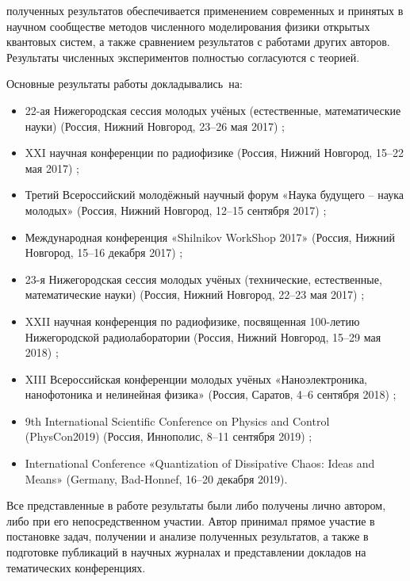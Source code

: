 {\reliability} полученных результатов обеспечивается применением современных и принятых в научном сообществе методов численного моделирования физики открытых квантовых систем, а также сравнением результатов с работами других авторов. 
Результаты численных экспериментов полностью согласуются с теорией.

{\probation}
Основные результаты работы докладывались~на:

\begin{itemize}
	\item 22-ая Нижегородская сессия молодых учёных (естественные, математические науки) (Россия, Нижний Новгород, 23--26 мая 2017) \cite{sessiann_2017};
	\item XXI научная конференции по радиофизике (Россия, Нижний Новгород, 15--22 мая 2017) \cite{rf_2017};
	\item Третий Всероссийский молодёжный научный форум «Наука будущего – наука молодых» (Россия, Нижний Новгород, 12--15 сентября 2017) \cite{sfy_2017};
	\item Международная конференция «Shilnikov WorkShop 2017» (Россия, Нижний Новгород, 15--16 декабря 2017) \cite{shilnikov_2017};
	\item 23-я Нижегородская сессия молодых учёных (технические, естественные, математические науки) (Россия, Нижний Новгород, 22--23 мая 2017) \cite{sessiann_2018};
	\item XXII научная конференция по радиофизике, посвященная 100-летию Нижегородской радиолаборатории (Россия, Нижний Новгород, 15--29 мая 2018) \cite{rf_2018};
	\item XIII Всероссийская конференции молодых учёных «Наноэлектроника, нанофотоника и нелинейная физика» (Россия, Саратов, 4--6 сентября 2018) \cite{nnnph_2018};
	\item 9th International Scientific Conference on Physics and Control (PhysCon2019) (Россия, Иннополис, 8--11 сентября 2019) \cite{physcon_2019};
	\item International Conference «Quantization of Dissipative Chaos: Ideas and Means» (Germany, Bad-Honnef, 16--20 декабря 2019).
\end{itemize}

{\contribution} Все представленные в работе результаты были либо
получены лично автором, либо при его непосредственном участии. Автор принимал прямое участие в постановке задач, получении и анализе полученных результатов, а также в подготовке публикаций в научных журналах и представлении докладов на тематических конференциях.

